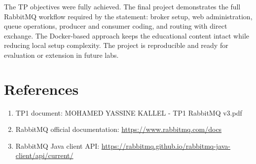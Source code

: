 \documentclass[a4paper,12pt]{article}
\begin{document}
The TP objectives were fully achieved. The final project demonstrates the full RabbitMQ workflow required by the statement: broker setup, web administration, queue operations, producer and consumer coding, and routing with direct exchange. The Docker-based approach keeps the educational content intact while reducing local setup complexity. The project is reproducible and ready for evaluation or extension in future labs.

\section{References}

\begin{enumerate}
    \item TP1 document: MOHAMED YASSINE KALLEL - TP1 RabbitMQ v3.pdf
    \item RabbitMQ official documentation: \url{https://www.rabbitmq.com/docs}
    \item RabbitMQ Java client API: \url{https://rabbitmq.github.io/rabbitmq-java-client/api/current/}
\end{enumerate}
\end{document}
